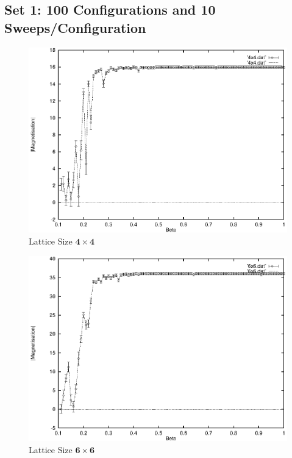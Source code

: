\documentclass[a4paper]{IEEEtran}
\begin{document}

    \subsection{Set 1: 100 Configurations and 10 Sweeps/Configuration}

    \begin{figure}
    \caption{Lattice Size $\mathbf{4 \times 4}$}
    \label{fig:4x4-1}
    \begin{center}
        \includegraphics[width=\columnwidth]{4x4_1.eps}
    \end{center}
    \end{figure} 

    \begin{figure}
    \caption{Lattice Size $\mathbf{6 \times 6}$}
    \label{fig:6x6-1}
    \begin{center}
        \includegraphics[width=\columnwidth]{6x6_1.eps}
    \end{center}
    \end{figure} 
\end{document}
